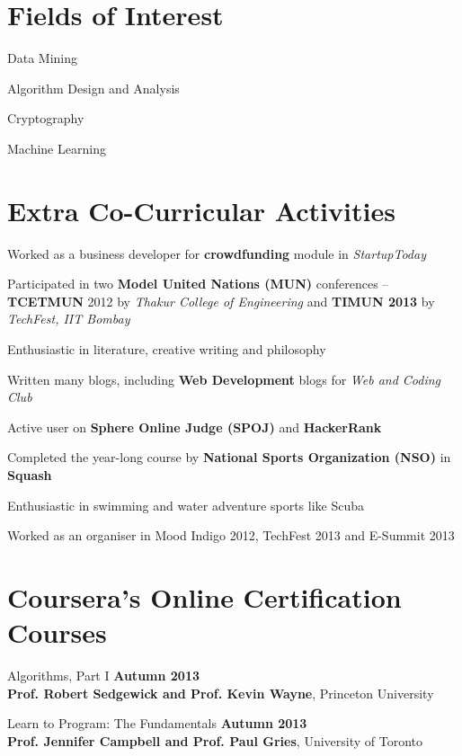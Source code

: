 \documentclass[margin,11pt]{resume}
\begin{document}
\begin{resume}
\section{\mysidestyle Fields of Interest}
\begin{list2}
\item Data Mining
\item Algorithm Design and Analysis
\item Cryptography
\item Machine Learning
\end{list2}
\section{\mysidestyle Extra Co-Curricular Activities}
\begin{list2}
\item Worked as a business developer for \textbf{crowdfunding} module in \textsl{StartupToday}
\item Participated in two \textbf{Model United Nations (MUN)} conferences -- \textbf{TCETMUN} 2012 by \textsl{Thakur College of Engineering} and \textbf{TIMUN 2013} by \textsl{TechFest, IIT Bombay}
\item Enthusiastic in literature, creative writing and philosophy
\item Written many blogs, including \textbf{Web Development} blogs for \textsl{Web and Coding Club}
\item Active user on \textbf{Sphere Online Judge (SPOJ)} and \textbf{HackerRank}
\item Completed the year-long course by \textbf{National Sports Organization (NSO)} in \textbf{Squash}
\item Enthusiastic in swimming and water adventure sports like Scuba
\item Worked as an organiser in Mood Indigo 2012, TechFest 2013 and E-Summit 2013
\end{list2}

\section{\mysidestyle Coursera's Online Certification Courses}
\begin{list2}
\item Algorithms, Part I  \hfill \textbf{Autumn 2013}\\
\textbf{Prof. Robert Sedgewick and Prof. Kevin Wayne}, Princeton University
\vspace{1mm}
\item Learn to Program: The Fundamentals \hfill \textbf{Autumn 2013}\\
\textbf{Prof. Jennifer Campbell and Prof. Paul Gries}, University of Toronto
\end{list2}



\end{resume}
\end{document}
